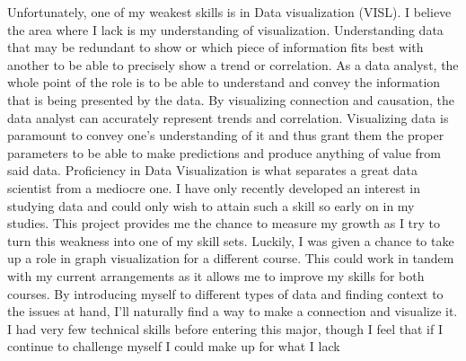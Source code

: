\documentclass[a4paper, 11pt]{report}
\begin{document}
Unfortunately, one of my weakest skills is in Data visualization (VISL)\cite{SFIA}. I believe the area where I lack is my understanding of visualization. Understanding data that may be redundant to show or which piece of information fits best with another to be able to precisely show a trend or correlation. As a data analyst, the whole point of the role is to be able to understand and convey the information that is being presented by the data. By visualizing connection and causation, the data analyst can accurately represent trends and correlation. Visualizing data is paramount to convey one’s understanding of it and thus grant them the proper parameters to be able to make predictions and produce anything of value from said data. Proficiency in Data Visualization is what separates a great data scientist from a mediocre one. I have only recently developed an interest in studying data and could only wish to attain such a skill so early on in my studies. This project provides me the chance to measure my growth as I try to turn this weakness into one of my skill sets. Luckily, I was given a chance to take up a role in graph visualization for a different course. This could work in tandem with my current arrangements as it allows me to improve my skills for both courses. By introducing myself to different types of data and finding context to the issues at hand, I’ll naturally find a way to make a connection and visualize it. I had very few technical skills before entering this major, though I feel that if I continue to challenge myself I could make up for what I lack
\end{document}
